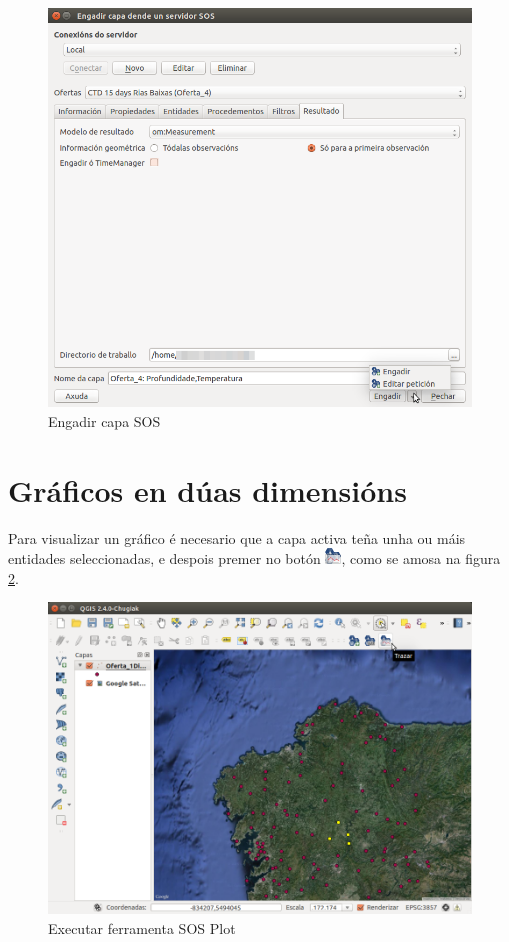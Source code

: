 \begin{figure}[hbtp]
\centering
\includegraphics[width=\textwidth]{images/manual/editar_peticion.png}
\caption{Engadir capa SOS}
\label{fig:editarPeticion}
\end{figure}

\section{Gráficos en dúas dimensións}

Para visualizar un gráfico é necesario que a capa activa teña unha ou máis entidades seleccionadas, e despois premer no botón \includegraphics[width=16px]{images/manual/icon_plot.png}, como se amosa na figura \ref{fig:ejecutarSOSPlot}.

\begin{figure}[hbtp]
\centering
\includegraphics[width=\textwidth]{images/manual/ejecutar_sosplot.png}
\caption{Executar ferramenta SOS Plot}
\label{fig:ejecutarSOSPlot}
\end{figure}

